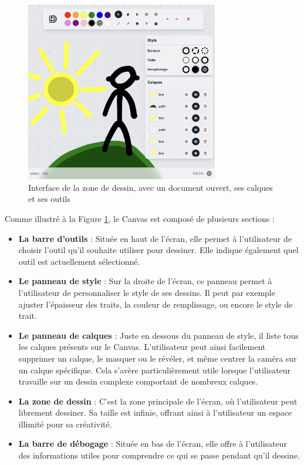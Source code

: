 \begin{figure}[H]
    \centering
    \includegraphics[width=0.75\textwidth]{assets/figures/describble-canvas.png}
    \caption{Interface de la zone de dessin, avec un document ouvert, ses calques et ses outils}
    \label{fig:canvas_interface}
\end{figure}

Comme illustré à la Figure \ref{fig:canvas_interface}, le Canvas est composé de plusieurs sections :

\begin{itemize}
    \item \textbf{La barre d'outils} : Située en haut de l'écran, elle permet à l'utilisateur de choisir l'outil qu'il souhaite utiliser pour dessiner. Elle indique également quel outil est actuellement sélectionné.
    \item \textbf{Le panneau de style} : Sur la droite de l'écran, ce panneau permet à l'utilisateur de personnaliser le style de ses dessins. Il peut par exemple ajuster l'épaisseur des traits, la couleur de remplissage, ou encore le style de trait.
    \item \textbf{Le panneau de calques} : Juste en dessous du panneau de style, il liste tous les calques présents sur le Canvas. L'utilisateur peut ainsi facilement supprimer un calque, le masquer ou le révéler, et même centrer la caméra sur un calque spécifique. Cela s'avère particulièrement utile lorsque l'utilisateur travaille sur un dessin complexe comportant de nombreux calques.
    \item \textbf{La zone de dessin} : C'est la zone principale de l'écran, où l'utilisateur peut librement dessiner. Sa taille est infinie, offrant ainsi à l'utilisateur un espace illimité pour sa créativité.
    \item \textbf{La barre de débogage} : Située en bas de l'écran, elle offre à l'utilisateur des informations utiles pour comprendre ce qui se passe pendant qu'il dessine.
\end{itemize}

